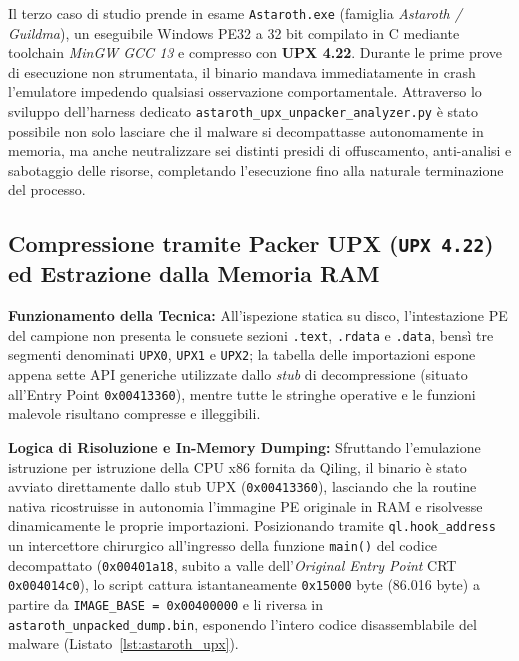 \documentclass[11pt, a4paper]{article}
\begin{document}
Il terzo caso di studio prende in esame \texttt{Astaroth.exe} (famiglia \textit{Astaroth / Guildma}), un eseguibile Windows PE32 a 32 bit compilato in C mediante toolchain \textit{MinGW GCC 13} e compresso con \textbf{UPX 4.22}. Durante le prime prove di esecuzione non strumentata, il binario mandava immediatamente in crash l'emulatore impedendo qualsiasi osservazione comportamentale. Attraverso lo sviluppo dell'harness dedicato \texttt{astaroth\_\allowbreak{}upx\_\allowbreak{}unpacker\_\allowbreak{}analyzer.\allowbreak{}py} \`e stato possibile non solo lasciare che il malware si decompattasse autonomamente in memoria, ma anche neutralizzare sei distinti presidi di offuscamento, anti-analisi e sabotaggio delle risorse, completando l'esecuzione fino alla naturale terminazione del processo.

\subsection{Compressione tramite Packer UPX (\texttt{UPX 4.22}) ed Estrazione dalla Memoria RAM}

\textbf{Funzionamento della Tecnica:} All'ispezione statica su disco, l'intestazione PE del campione non presenta le consuete sezioni \texttt{.text}, \texttt{.rdata} e \texttt{.data}, bens\`i tre segmenti denominati \texttt{UPX0}, \texttt{UPX1} e \texttt{UPX2}; la tabella delle importazioni espone appena sette API generiche utilizzate dallo \textit{stub} di decompressione (situato all'Entry Point \texttt{0x00413360}), mentre tutte le stringhe operative e le funzioni malevole risultano compresse e illeggibili.

\textbf{Logica di Risoluzione e In-Memory Dumping:} Sfruttando l'emulazione istruzione per istruzione della CPU x86 fornita da Qiling, il binario \`e stato avviato direttamente dallo stub UPX (\texttt{0x00413360}), lasciando che la routine nativa ricostruisse in autonomia l'immagine PE originale in RAM e risolvesse dinamicamente le proprie importazioni. Posizionando tramite \texttt{ql.\allowbreak{}hook\_\allowbreak{}address} un intercettore chirurgico all'ingresso della funzione \texttt{main()} del codice decompattato (\texttt{0x00401a18}, subito a valle dell'\textit{Original Entry Point} CRT \texttt{0x004014c0}), lo script cattura istantaneamente \texttt{0x15000} byte (86.016 byte) a partire da \texttt{IMAGE\_\allowbreak{}BASE = 0x00400000} e li riversa in \texttt{astaroth\_\allowbreak{}unpacked\_\allowbreak{}dump.\allowbreak{}bin}, esponendo l'intero codice disassemblabile del malware (Listato~\ref{lst:astaroth_upx}).
\end{document}
